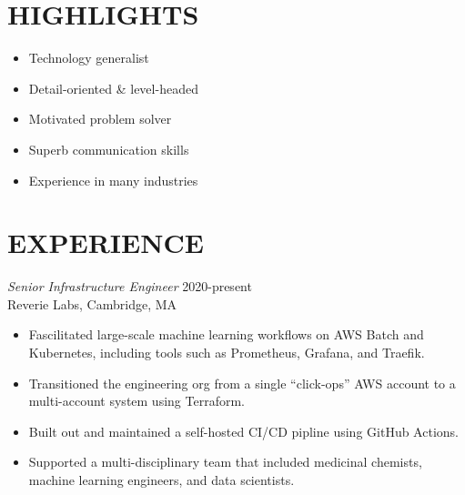 \documentclass[line,margin]{res}
\begin{document}
\address{\,\,\,\,\,\,\,\,\,\,\,\,\,\,\,\,\,\,\,\,\, dana.merrick@gmail.com}
\address{\,\,\,\,\,\,\,\,\,\,\,\,\,\,\,\,\,\,\,\,USA-based -- 978.206.1331}

\begin{resume}

\section{HIGHLIGHTS}
  \begin{itemize}  \itemsep -2pt %
    \item Technology generalist
    \item Detail-oriented \& level-headed
    \item Motivated problem solver
    \item Superb communication skills
    \item Experience in many industries
  \end{itemize}
  
\section{EXPERIENCE}
  {\sl Senior Infrastructure Engineer}  \hfill 2020-present \\
  Reverie Labs,
  Cambridge, MA
  \begin{itemize}  \itemsep -2pt %
    \item Fascilitated large-scale machine learning workflows on AWS Batch and Kubernetes, including tools such as Prometheus, Grafana, and Traefik.
    \item Transitioned the engineering org from a single ``click-ops'' AWS account to a multi-account system using Terraform.
    \item Built out and maintained a self-hosted CI/CD pipline using GitHub Actions.
    \item Supported a multi-disciplinary team that included medicinal chemists, machine learning engineers, and data scientists.
  \end{itemize}


\end{resume}
\end{document}
